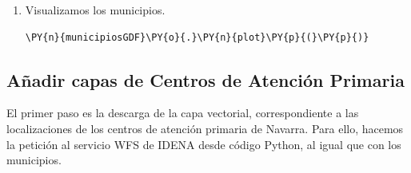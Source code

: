 \begin{itemize}
\begin{enumerate}
        \item Visualizamos los municipios.
\begin{tcolorbox}[breakable, size=fbox, boxrule=1pt, colback=cellbackground, colframe=cellborder, fontupper=\footnotesize]
    \begin{Verbatim}[commandchars=\\\{\}]
    \PY{n}{municipiosGDF}\PY{o}{.}\PY{n}{plot}\PY{p}{(}\PY{p}{)}
    \end{Verbatim}
\end{tcolorbox}
        \begin{center}
        \end{center}
    \end{enumerate} 
\end{itemize}

\subsection{Añadir capas de Centros de Atención Primaria}
El primer paso es la descarga de la capa vectorial, correspondiente a las localizaciones de los centros de atención primaria de Navarra.
Para ello, hacemos la petición al servicio WFS de IDENA desde código Python, al igual que con los municipios.

